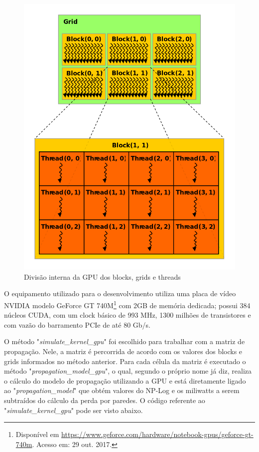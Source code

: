 \documentclass[
	12pt,				%
	openright,			%
	twoside,			%
	a4paper,			%
	english,			%
	french,				%
	spanish,			%
	brazil				%
	]{abntex2}
\begin{document}
\begin{figure}[ht]
	\caption{\label{grid_blocks}Divisão interna da GPU dos blocks, grids e threads}
	\begin{center}
		\includegraphics[scale=0.4]{images/block-grid.jpg}
	\end{center}
\end{figure}

O equipamento utilizado para o desenvolvimento utiliza uma placa de vídeo NVIDIA modelo GeForce GT 740M\footnote{Disponível em \url{https://www.geforce.com/hardware/notebook-gpus/geforce-gt-740m}. Acesso em: 29 out. 2017.} com 2GB de memória dedicada; possui 384 núcleos CUDA, com um clock básico de 993 MHz, 1300 milhões de transistores e com vazão do barramento PCIe de até 80 Gb/s.

O método "\textit{simulate\_kernel\_gpu}" foi  escolhido para trabalhar com a matriz de propagação. Nele, a matriz é percorrida de acordo com os valores dos blocks e grids informados no método anterior. Para cada célula da matriz é executado o método "\textit{propagation\_model\_gpu}", o qual, segundo o próprio nome já diz, realiza o cálculo do modelo de propagação utilizando a GPU e está diretamente ligado ao "\textit{propagation\_model}" que obtém valores do NP-Log e os miliwatts a serem subtraídos do cálculo da perda por paredes. O código referente ao "\textit{simulate\_kernel\_gpu}" pode ser visto abaixo.
\end{document}
